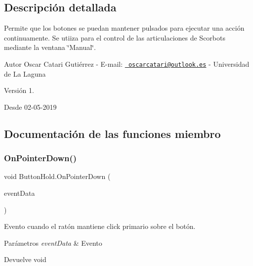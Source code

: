 \subsection{Descripción detallada}
Permite que los botones se puedan mantener pulsados para ejecutar una acción continuamente. Se utiiza para el control de las articulaciones de Scorbots mediante la ventana \char`\"{}\+Manual\char`\"{}. \begin{DoxyAuthor}{Autor}
Oscar Catari Gutiérrez -\/ E-\/mail\+: \href{mailto:oscarcatari@outlook.es}{\texttt{ oscarcatari@outlook.\+es}} -\/ Universidad de La Laguna 
\end{DoxyAuthor}
\begin{DoxyVersion}{Versión}
1. 
\end{DoxyVersion}
\begin{DoxySince}{Desde}
02-\/05-\/2019 
\end{DoxySince}


\subsection{Documentación de las funciones miembro}
\mbox{\label{class_button_hold_a2e1f8ebf88714ea3e86261ef811c9941}} 
\subsubsection{\texorpdfstring{OnPointerDown()}{OnPointerDown()}}
{\footnotesize\ttfamily void Button\+Hold.\+On\+Pointer\+Down (\begin{DoxyParamCaption}\item[{Pointer\+Event\+Data}]{event\+Data }\end{DoxyParamCaption})\hspace{0.3cm}{\ttfamily [inline]}}

Evento cuando el ratón mantiene click primario sobre el botón. 
\begin{DoxyParams}{Parámetros}
{\em event\+Data} & Evento \\
\hline
\end{DoxyParams}
\begin{DoxyReturn}{Devuelve}
void 
\end{DoxyReturn}
\mbox{\label{class_button_hold_a2512c68bf1ec55d4bae22da5ef7ed66a}} 
